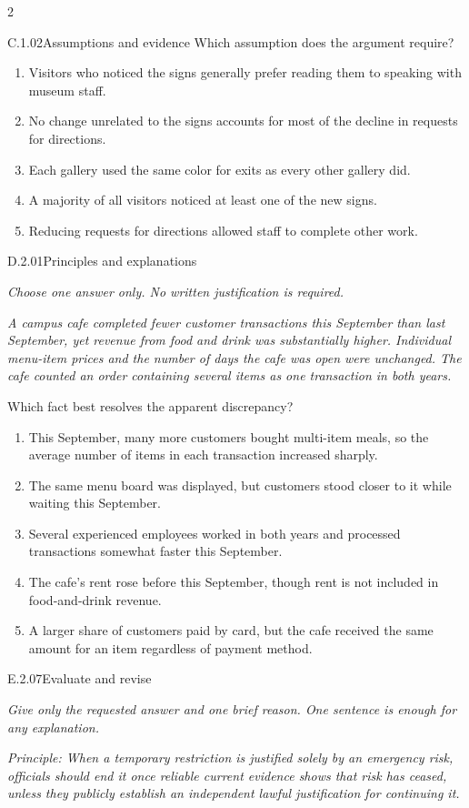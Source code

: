 \documentclass[9pt]{extarticle}
\newcommand{\choice}[1]{\item #1}
\begin{document}
\begin{multicols}{2}
\begin{DenseCoreProblem}{C.1.02}{Assumptions and evidence}
Which assumption does the argument require?
\begin{enumerate}[label=(\alph*)]
  \choice{Visitors who noticed the signs generally prefer reading them to speaking with museum staff.}
  \choice{No change unrelated to the signs accounts for most of the decline in requests for directions.}
  \choice{Each gallery used the same color for exits as every other gallery did.}
  \choice{A majority of all visitors noticed at least one of the new signs.}
  \choice{Reducing requests for directions allowed staff to complete other work.}
\end{enumerate}
\end{DenseCoreProblem}
\begin{DenseCoreProblem}{D.2.01}{Principles and explanations}
{\scriptsize\textit{Choose one answer only. No written justification is required.}\par}
\emph{A campus cafe completed fewer customer transactions this September than last September, yet revenue from food and drink was substantially higher. Individual menu-item prices and the number of days the cafe was open were unchanged. The cafe counted an order containing several items as one transaction in both years.}

Which fact best resolves the apparent discrepancy?
\begin{enumerate}[label=(\alph*)]
  \choice{This September, many more customers bought multi-item meals, so the average number of items in each transaction increased sharply.}
  \choice{The same menu board was displayed, but customers stood closer to it while waiting this September.}
  \choice{Several experienced employees worked in both years and processed transactions somewhat faster this September.}
  \choice{The cafe's rent rose before this September, though rent is not included in food-and-drink revenue.}
  \choice{A larger share of customers paid by card, but the cafe received the same amount for an item regardless of payment method.}
\end{enumerate}
\end{DenseCoreProblem}
\begin{DenseCoreProblem}{E.2.07}{Evaluate and revise}
{\scriptsize\textit{Give only the requested answer and one brief reason. One sentence is enough for any explanation.}\par}
\emph{Principle: When a temporary restriction is justified solely by an emergency risk, officials should end it once reliable current evidence shows that risk has ceased, unless they publicly establish an independent lawful justification for continuing it.}


\end{DenseCoreProblem}
\end{multicols}
\end{document}
